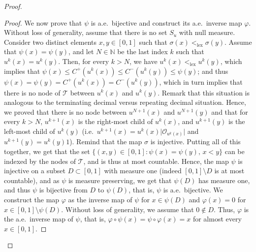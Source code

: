 \documentclass{amsart}
\newcommand{\aE}{a.e.\ }
\newcommand{\ie}{i.e.\ }
\theoremstyle{plain}
\theoremstyle{definition}
\newcommand{\cO}{\mathcal{O}}
\newcommand{\cT}{\mathcal{T}}
\newcommand{\N}{\mathbb{N}}
\newcommand{\linflex}{<_{\mathrm{lex}}}
\begin{document}
\begin{proof}
\begin{proof}
\medskip

We now prove that $\psi$ is \aE bijective
	and construct its \aE inverse map $\varphi$.
Without loss of generality, assume that there is no set $S_u$ with null measure.
Consider two distinct elements $x,y\in [0,1]$ such that $\sigma(x) \linflex \sigma(y)$.
Assume that $\psi(x) = \psi(y)$, and let $N\in\N$ be 
	the last index $k$ such that $u^k(x) = u^k(y)$.
Then, for every $k>N$, we have $u^k(x) \linflex u^k(y)$,
which implies that 
$\psi(x) \leq C^+(u^k(x)) \leq C^-(u^k(y)) \leq \psi(y)$;
and thus $\psi(x) = \psi(y)  = C^+(u^k(x)) = C^-(u^k(y))$,
which in turn implies that there is no node of $\cT$
	between $u^k(x)$ and $u^k(y)$.
Remark that this situation is analogous to the terminating decimal
	versus repeating decimal situation.
Hence, we proved that there is no node between $u^{N+1}(x)$ and $u^{N+1}(y)$
and that for every $k>N$,
	$u^{k+1}(x)$ is the right-most child of $u^k(x)$,
	and $u^{k+1}(y)$ is the left-most child of $u^k(y)$
	(\ie $u^{k+1}(x) = u^{k}(x) \vert \cO_{u^{k}(x)} \vert$
		and $u^{k+1}(y) = u^{k}(y) 1$).
Remind that the map $\sigma$ is injective.
Putting all of this together, we get that the set 
	$\{ (x,y)\in [0,1] : \psi(x) = \psi(y),\, x<y \}$
	can be indexed by the nodes of $\cT$, and is thus at most countable.
Hence, the map $\psi$ is injective on a subset $D\subset [0,1]$ with measure one
	(indeed $[0,1]\setminus D$ is at most countable),
	and as $\psi$ is measure preserving, we get that $\psi(D)$ has measure one,
	and thus $\psi$ is bijective from $D$ to $\psi(D)$, that is, $\psi$ is \aE bijective.
We construct the map $\varphi$ as the inverse map of $\psi$ for $x\in\psi(D)$
	and $\varphi(x)=0$ for $x\in [0,1]\setminus\psi(D)$.
Without loss of generality, we assume that $0\not\in D$.
Thus, $\varphi$ is the \aE inverse map of $\psi$, that is, 
	$\varphi \circ \psi(x) = \psi \circ \varphi(x) = x$ for almost every $x\in [0,1]$.
	

\end{proof}
\end{proof}
\end{document}
